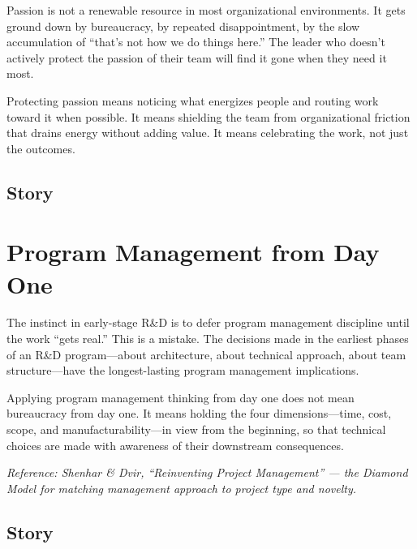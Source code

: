 
Passion is not a renewable resource in most organizational environments.
It gets ground down by bureaucracy, by repeated disappointment, by the slow
accumulation of ``that's not how we do things here.'' The leader who doesn't
actively protect the passion of their team will find it gone when they need it most.

Protecting passion means noticing what energizes people and routing work toward it
when possible. It means shielding the team from organizational friction that drains
energy without adding value. It means celebrating the work, not just the outcomes.

\subsection{Story}

\section{Program Management from Day One}


The instinct in early-stage R\&D is to defer program management discipline
until the work ``gets real.'' This is a mistake. The decisions made in the
earliest phases of an R\&D program---about architecture, about technical approach,
about team structure---have the longest-lasting program management implications.

Applying program management thinking from day one does not mean bureaucracy
from day one. It means holding the four dimensions---time, cost, scope,
and manufacturability---in view from the beginning, so that technical choices
are made with awareness of their downstream consequences.

\textit{Reference: Shenhar \& Dvir, ``Reinventing Project Management'' ---
the Diamond Model for matching management approach to project type and novelty.}

\subsection{Story}


